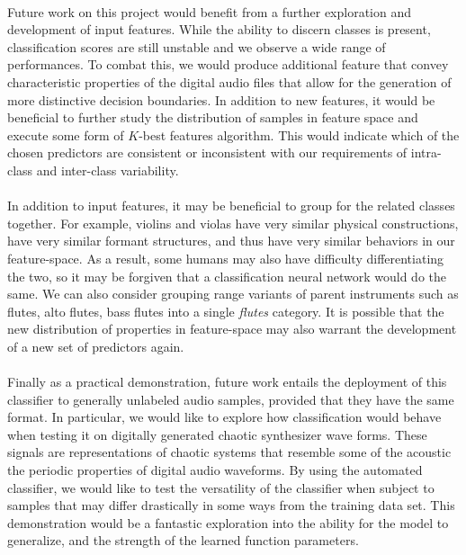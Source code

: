 \documentclass[12pt,letterpaper]{article}
\begin{document}
\paragraph*{}Future work on this project would benefit from a further exploration and development of input features. While the ability to discern classes is present, classification scores are still unstable and we observe a wide range of performances. To combat this, we would produce additional feature that convey characteristic properties of the digital audio files that allow for the generation of more distinctive decision boundaries. In addition to new features, it would be beneficial to further study the distribution of samples in feature space and execute some form of $K$-best features algorithm. This would indicate which of the  chosen predictors are consistent or inconsistent with our requirements of intra-class and inter-class variability. 

\paragraph*{}In addition to input features, it may be beneficial to group for the related classes together. For example, violins and violas have very similar physical constructions, have very similar formant structures, and thus have very similar behaviors in our feature-space. As a result, some humans may also have difficulty differentiating the two, so it may be forgiven that a classification neural network would do the same. We can also consider grouping range variants of parent instruments such as flutes, alto flutes, bass flutes into a single \textit{flutes} category. It is possible that the new distribution of properties in feature-space may also warrant the development of a new set of predictors again. 

\paragraph*{}Finally as a practical demonstration, future work entails the deployment of this classifier to generally unlabeled audio samples, provided that they have the same format. In particular, we would like to explore how classification would behave when testing it on digitally generated chaotic synthesizer wave forms. These signals are representations of chaotic systems that resemble some of the acoustic the periodic properties of digital audio waveforms. By using the automated classifier, we would like to test the versatility of the classifier when subject to samples that may differ drastically in some ways from the training data set. This demonstration would be a fantastic exploration into the ability for the model to generalize, and the strength of the learned function parameters.
\end{document}
